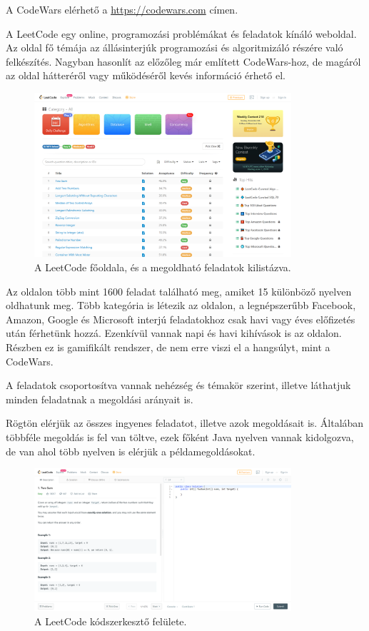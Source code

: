 A CodeWars elérhető a \url{https://codewars.com} címen.


A LeetCode egy online, programozási problémákat és feladatok kínáló weboldal. Az oldal fő témája az állásinterjúk programozási és algoritmizáló részére való felkészítés. \cite{leetcode} Nagyban hasonlít az előzőleg már említett CodeWars-hoz, de magáról az oldal hátteréről vagy működéséről kevés információ érhető el.

\begin{figure}[h]
    \centering
    \includegraphics[width=0.85\textwidth]{images/leetcode_problems.png}
    \caption{A LeetCode főoldala, és a megoldható feladatok kilistázva.}
    \label{fig:leetcode_problems}
\end{figure}

Az oldalon több mint 1600 feladat található meg, amiket 15 különböző nyelven oldhatunk meg. Több kategória is létezik az oldalon, a legnépszerűbb Facebook, Amazon, Google és Microsoft interjú feladatokhoz csak havi vagy éves előfizetés után férhetünk hozzá. Ezenkívül vannak napi és havi kihívások is az oldalon. Részben ez is gamifikált rendszer, de nem erre viszi el a hangsúlyt, mint a CodeWars.

A feladatok csoportosítva vannak nehézség és témakör szerint, illetve láthatjuk minden feladatnak a megoldási arányait is.

Rögtön elérjük az összes ingyenes feladatot, illetve azok megoldásait is. Általában többféle megoldás is fel van töltve, ezek főként Java nyelven vannak kidolgozva, de van ahol több nyelven is elérjük a példamegoldásokat.

\begin{figure}[h]
    \centering
    \includegraphics[width=0.85\textwidth]{images/leetcode_editor.png}
    \caption{A LeetCode kódszerkesztő felülete.}
    \label{fig:leetcode_editor}
\end{figure}


